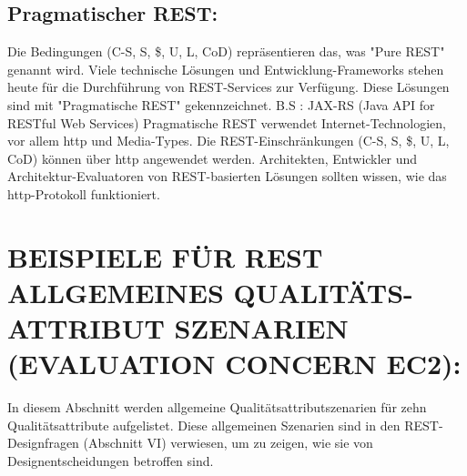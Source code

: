 \documentclass{acmsiggraph}
\begin{document}
\subsection{Pragmatischer REST:}
Die Bedingungen (C-S, S, \$, U, L, CoD) repräsentieren das, was "Pure REST" genannt wird.
Viele technische Lösungen und Entwicklung-Frameworks stehen heute  für die Durchführung von REST-Services zur Verfügung. Diese Lösungen sind mit "Pragmatische REST" gekennzeichnet. B.S : JAX-RS (Java API for RESTful Web Services)
Pragmatische REST verwendet Internet-Technologien, vor allem http und Media-Types. Die REST-Einschränkungen (C-S, S, \$, U, L, CoD) können über http angewendet werden.
Architekten, Entwickler und Architektur-Evaluatoren von REST-basierten Lösungen sollten wissen, wie das http-Protokoll funktioniert.
\section{BEISPIELE FÜR REST ALLGEMEINES QUALITÄTS-ATTRIBUT SZENARIEN (EVALUATION CONCERN EC2):}
In diesem Abschnitt werden allgemeine Qualitätsattributszenarien für zehn Qualitätsattribute aufgelistet.
Diese allgemeinen Szenarien sind in den REST-Designfragen (Abschnitt VI) verwiesen, um zu zeigen, wie sie von Designentscheidungen betroffen sind.
\vspace{4px}
\end{document}
